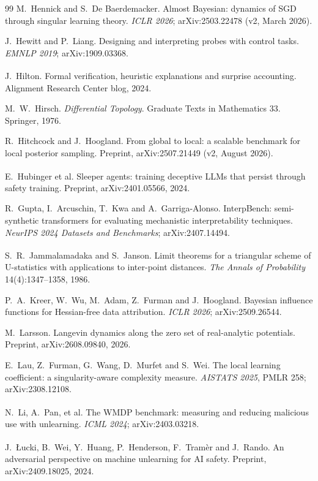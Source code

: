 \documentclass[11pt,a4paper]{article}
\newcommand{\unv}{\textsuperscript{\dag}}
\begin{document}
\begin{thebibliography}{99}
 M.~Hennick and S.~De Baerdemacker. Almost Bayesian: dynamics of SGD through singular learning theory. \emph{ICLR 2026};
arXiv:2503.22478 (v2, March 2026).

 J.~Hewitt and P.~Liang. Designing and
interpreting probes with control tasks. \emph{EMNLP 2019};
arXiv:1909.03368.

\unv{} J.~Hilton. Formal verification, heuristic
explanations and surprise accounting. Alignment Research Center blog,
2024.

 M.~W.~Hirsch. \emph{Differential Topology}. Graduate
Texts in Mathematics 33. Springer, 1976.

 R.~Hitchcock and J.~Hoogland. From global to local:
a scalable benchmark for local posterior sampling. Preprint,
arXiv:2507.21449 (v2, August 2026).

\unv{} E.~Hubinger et al. Sleeper agents: training
deceptive LLMs that persist through safety training. Preprint,
arXiv:2401.05566, 2024.

 R.~Gupta, I.~Arcuschin, T.~Kwa and
A.~Garriga-Alonso. InterpBench: semi-synthetic transformers for evaluating
mechanistic interpretability techniques. \emph{NeurIPS 2024 Datasets and
Benchmarks}; arXiv:2407.14494.

\unv{} S.~R.~Jammalamadaka and S.~Janson. Limit
theorems for a triangular scheme of U-statistics with applications to
inter-point distances. \emph{The Annals of Probability} 14(4):1347--1358,
1986.

 P.~A.~Kreer, W.~Wu, M.~Adam, Z.~Furman and J.~Hoogland.
Bayesian influence functions for Hessian-free data attribution.
\emph{ICLR 2026}; arXiv:2509.26544.

 M.~Larsson. Langevin dynamics along the zero set of
real-analytic potentials. Preprint, arXiv:2608.09840, 2026.

 E.~Lau, Z.~Furman, G.~Wang, D.~Murfet and S.~Wei. The
local learning coefficient: a singularity-aware complexity measure.
\emph{AISTATS 2025}, PMLR 258; arXiv:2308.12108.

\unv{} N.~Li, A.~Pan, et al. The WMDP benchmark:
measuring and reducing malicious use with unlearning. \emph{ICML 2024};
arXiv:2403.03218.

\unv{} J.~\L{}ucki, B.~Wei, Y.~Huang, P.~Henderson,
F.~Tram\`er and J.~Rando. An adversarial perspective on machine
unlearning for AI safety. Preprint, arXiv:2409.18025, 2024.


\end{thebibliography}
\end{document}
